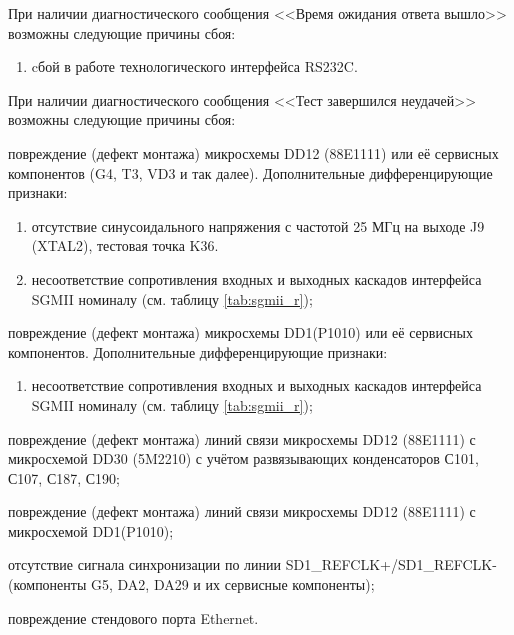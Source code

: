     \subpoint При наличии диагностического сообщения <<Время ожидания ответа вышло>> возможны следующие причины сбоя:
      \begin{enumerate}
	\item cбой в работе технологического интерфейса RS232C.
      \end{enumerate}
      
    \subpoint При наличии диагностического сообщения <<Тест завершился неудачей>> возможны следующие причины сбоя:
      \begin{enumerate}\begin{sloppypar}
	\item повреждение (дефект монтажа) микросхемы DD12 (88E1111) или её сервисных компонентов (G4, T3, VD3 и так далее). Дополнительные дифференцирующие признаки:
	  \begin{enumerate}
	    \item отсутствие синусоидального напряжения с частотой 25 МГц на выходе J9 (XTAL2), тестовая точка K36.
	    \item несоответствие сопротивления входных и выходных каскадов интерфейса SGMII номиналу (см. таблицу \ref{tab:sgmii_r});
	  \end{enumerate}
	\item повреждение (дефект монтажа) микросхемы DD1(P1010) или её сервисных компонентов. Дополнительные дифференцирующие признаки:
	  \begin{enumerate}	  
	    \item несоответствие сопротивления входных и выходных каскадов интерфейса SGMII номиналу (см. таблицу \ref{tab:sgmii_r});
	  \end{enumerate}
	\item повреждение (дефект монтажа) линий связи микросхемы DD12 (88E1111) с микросхемой DD30 (5M2210) с учётом развязывающих конденсаторов С101, С107, С187, С190;
	\item повреждение (дефект монтажа) линий связи микросхемы DD12 (88E1111) с микросхемой DD1(P1010);
	\item отсутствие сигнала синхронизации по линии SD1\_REFCLK+/SD1\_REFCLK- (компоненты G5, DA2, DA29 и их сервисные компоненты);
	\item повреждение стендового порта Ethernet.
      \end{sloppypar}\end{enumerate}
      
